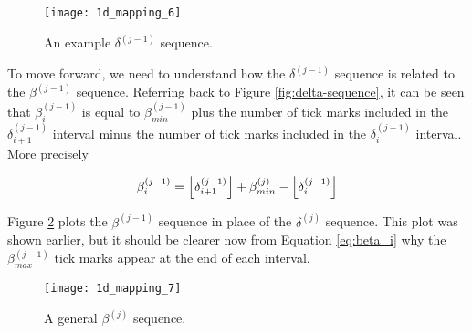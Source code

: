 \begin{figure}[H]
  \begin{center}
    \texttt{[image: 1d\_mapping\_6]}
  \end{center}
  \vspace{-.2in} %
  \caption{\label{fig:delta-sequence-2} An example $\delta^{(j-1)}$ sequence.}
\end{figure}

To move forward, we need to understand how the $\delta^{(j-1)}$ sequence is related to the $\beta^{(j-1)}$ sequence. Referring back to Figure \ref{fig:delta-sequence}, it can be seen that $\beta^{(j-1)}_i$ is equal to $\beta^{(j-1)}_{min}$ plus the number of tick marks included in the $\delta^{(j-1)}_{i+1}$ interval minus the number of tick marks included in the $\delta^{(j-1)}_i$ interval. More precisely

\begin{align}\label{eq:beta_i}
  \beta^{(j-1)}_i = \floor{\delta^{(j-1)}_{i+1}} + \beta^{(j)}_{min} - \floor{\delta^{(j-1)}_i} 
\end{align}

Figure \ref{fig:beta-sequence-j} plots the $\beta^{(j-1)}$ sequence in place of the $\delta^{(j)}$ sequence. This plot was shown earlier, but it should be clearer now from Equation \ref{eq:beta_i} why the $\beta^{(j-1)}_{max}$ tick marks appear at the end of each interval.

\begin{figure}[H]
  \begin{center}
    \texttt{[image: 1d\_mapping\_7]}
  \end{center}
  \vspace{-.2in} %
  \caption{\label{fig:beta-sequence-j} A general $\beta^{(j)}$ sequence.}
\end{figure}



